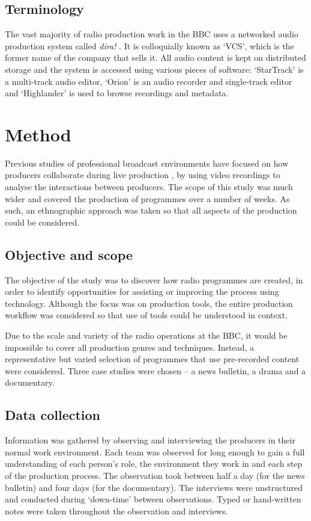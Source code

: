 \subsection{Terminology}
The vast majority of radio production work in the BBC uses a networked audio production system called \textit{dira!}
\citep{SCISYS2015}. It is colloquially known as `VCS', which is the former name of the company that sells it. All audio
content is kept on distributed storage and the system is accessed using various pieces of software: `StarTrack' is a
multi-track audio editor, `Orion' is an audio recorder and single-track editor and `Highlander' is used to browse
recordings and metadata. 

\section{Method}\label{sec:method}
Previous studies of professional broadcast environments have focused on how producers collaborate during live
production \citep{Engstroem2010,Perry2009}, by using video recordings to analyse the interactions between producers.
The scope of this study was much wider and covered the production of programmes over a number of weeks. As such, an
ethnographic approach was taken so that all aspects of the production could be considered.

\subsection{Objective and scope}
The objective of the study was to discover how radio programmes are created, in order to identify opportunities for
assisting or improving the process using technology. Although the focus was on production tools, the entire production
workflow was considered so that use of tools could be understood in context.

Due to the scale and variety of the radio operations at the BBC, it would be impossible to cover all production genres
and techniques.  Instead, a representative but varied selection of programmes that use pre-recorded content were
considered. Three case studies were chosen --  a news bulletin, a drama and a documentary.

\subsection{Data collection}
Information was gathered by observing and interviewing the producers in their normal work environment. Each team was
observed for long enough to gain a full understanding of each person's role, the environment they work in and each step
of the production process. The observation took between half a day (for the news bulletin) and four days (for the
documentary). The interviews were unstructured and conducted during `down-time' between observations.  Typed or
hand-written notes were taken throughout the observation and interviews.

